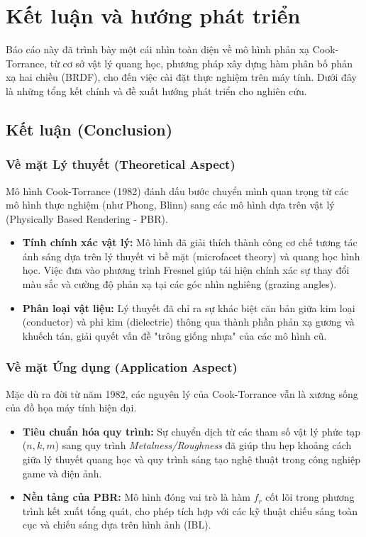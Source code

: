 \chapter{Kết luận và hướng phát triển}

Báo cáo này đã trình bày một cái nhìn toàn diện về mô hình phản xạ Cook-Torrance, từ cơ sở vật lý quang học, phương pháp xây dựng hàm phân bố phản xạ hai chiều (BRDF), cho đến việc cài đặt thực nghiệm trên máy tính. Dưới đây là những tổng kết chính và đề xuất hướng phát triển cho nghiên cứu.

\section{Kết luận (Conclusion)}

\subsection{Về mặt Lý thuyết (Theoretical Aspect)}
Mô hình Cook-Torrance (1982) đánh dấu bước chuyển mình quan trọng từ các mô hình thực nghiệm (như Phong, Blinn) sang các mô hình dựa trên vật lý (Physically Based Rendering - PBR).
\begin{itemize}
	\item \textbf{Tính chính xác vật lý:} Mô hình đã giải thích thành công cơ chế tương tác ánh sáng dựa trên lý thuyết vi bề mặt (microfacet theory) và quang học hình học. Việc đưa vào phương trình Fresnel giúp tái hiện chính xác sự thay đổi màu sắc và cường độ phản xạ tại các góc nhìn nghiêng (grazing angles).
	\item \textbf{Phân loại vật liệu:} Lý thuyết đã chỉ ra sự khác biệt căn bản giữa kim loại (conductor) và phi kim (dielectric) thông qua thành phần phản xạ gương và khuếch tán, giải quyết vấn đề "trông giống nhựa" của các mô hình cũ.
\end{itemize}

\subsection{Về mặt Ứng dụng (Application Aspect)}
Mặc dù ra đời từ năm 1982, các nguyên lý của Cook-Torrance vẫn là xương sống của đồ họa máy tính hiện đại.
\begin{itemize}
	\item \textbf{Tiêu chuẩn hóa quy trình:} Sự chuyển dịch từ các tham số vật lý phức tạp ($n, k, m$) sang quy trình \textit{Metalness/Roughness} đã giúp thu hẹp khoảng cách giữa lý thuyết quang học và quy trình sáng tạo nghệ thuật trong công nghiệp game và điện ảnh.
	\item \textbf{Nền tảng của PBR:} Mô hình đóng vai trò là hàm $f_r$ cốt lõi trong phương trình kết xuất tổng quát, cho phép tích hợp với các kỹ thuật chiếu sáng toàn cục và chiếu sáng dựa trên hình ảnh (IBL).
\end{itemize}


